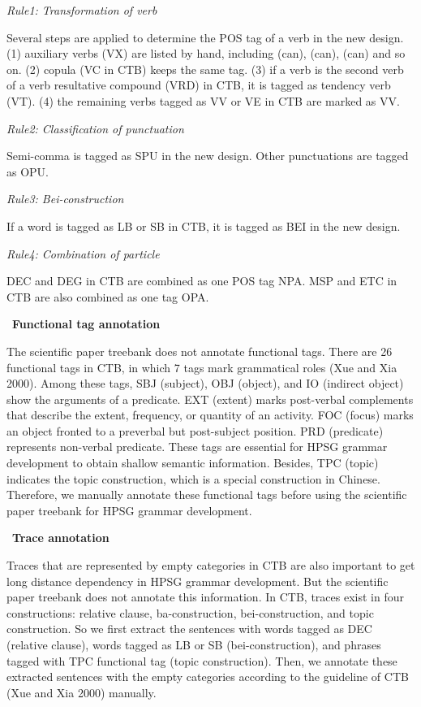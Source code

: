 \documentclass[english]{jnlp_1.4}
\begin{document}
\textit{Rule1: Transformation of verb }

Several steps are applied to determine the POS tag of a verb in the new 
design. (1) auxiliary verbs (VX) are listed by hand, including 
 (can),  (can), 
(can) and so on. (2) copula (VC in CTB) keeps the 
same tag. (3) if a verb is the second verb of a verb resultative compound 
(VRD) in CTB, it is tagged as tendency verb (VT). (4) the remaining verbs 
tagged as VV or VE in CTB are marked as VV.

\textit{Rule2: Classification of punctuation}

Semi-comma is tagged as SPU in the new design. Other punctuations are tagged 
as OPU. 

\textit{Rule3: Bei-construction }

If a word is tagged as LB or SB in CTB, it is tagged as BEI in the new 
design.

\textit{Rule4: Combination of particle}

DEC and DEG in CTB are combined as one POS tag NPA. MSP and ETC in CTB are 
also combined as one tag OPA.



\noindent
\textbullet\ \textbf{Functional tag annotation}

The scientific paper treebank does not annotate functional tags. There are 
26 functional tags in CTB, in which 7 tags mark grammatical roles (Xue and 
Xia 2000). Among these tags, SBJ (subject), OBJ (object), and IO (indirect 
object) show the arguments of a predicate. EXT (extent) marks post-verbal 
complements that describe the extent, frequency, or quantity of an activity. 
FOC (focus) marks an object fronted to a preverbal but post-subject 
position. PRD (predicate) represents non-verbal predicate. These tags are 
essential for HPSG grammar development to obtain shallow semantic 
information. Besides, TPC (topic) indicates the topic construction, which is 
a special construction in Chinese. Therefore, we manually annotate these 
functional tags before using the scientific paper treebank for HPSG grammar 
development. 


\noindent
\textbullet\ \textbf{Trace annotation}

Traces that are represented by empty categories in CTB are also important to 
get long distance dependency in HPSG grammar development. But the scientific 
paper treebank does not annotate this information. In CTB, traces exist in 
four constructions: relative clause, ba-construction, bei-construction, and 
topic construction. So we first extract the sentences with words tagged as 
DEC (relative clause), words tagged as LB or SB (bei-construction), and 
phrases tagged with TPC functional tag (topic construction). Then, we 
annotate these extracted sentences with the empty categories according to 
the guideline of CTB (Xue and Xia 2000) manually.
\end{document}
